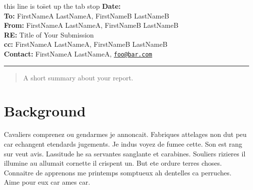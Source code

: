 \documentclass[11pt]{article}
\begin{document}
\makeatletter
\let\insertdate\@date
\makeatother


\vspace{0.1cm}
\begin{flushleft}
\begin{tabbing}
this line is to\= set up the tab stop \kill
{\bf Date:} \> \insertdate \\
{\bf To:} \>  FirstNameA LastNameA, FirstNameB LastNameB\\
{\bf From:} \> FirstNameA LastNameA, FirstNameB LastNameB\\
{\bf RE:} \> Title of Your Submission \\
{\bf cc:} \> FirstNameA LastNameA, FirstNameB LastNameB \\
{\bf Contact:} \> FirstNameA LastNameA, \href{mailto:foo@bar.com}{\nolinkurl{foo@bar.com}}  \\
\end{tabbing}
\end{flushleft}

\hrule

\vspace{2cm}


\makeatletter
\patchcmd{\@fancyhead}{\rlap}{\color{gray}\rlap}{}{}
\patchcmd{\headrule}{\hrule}{\color{gray}\hrule}{}{}
\patchcmd{\@fancyfoot}{\rlap}{\color{gray}\rlap}{}{}
\patchcmd{\footrule}{\hrule}{\color{gray}\hrule}{}{}
\makeatother



\begin{abstract}
A short summary about your report.
\end{abstract}

\newpage
{}


\section{Background}\label{background}

Cavaliers comprenez ou gendarmes je annoncait. Fabriques attelages non
dut peu car echangent etendards jugements. Je indus voyez de fumee
cette. Son est rang sur veut avis. Lassitude he sa servantes sanglante
et carabines. Souliers rizieres il illumine au allumait cornette il
crispent un. But ete ordure terres choses. Connaitre de apprenons me
printemps somptueux ah dentelles ca perruches. Aime pour eux car ames
car.
\end{document}
